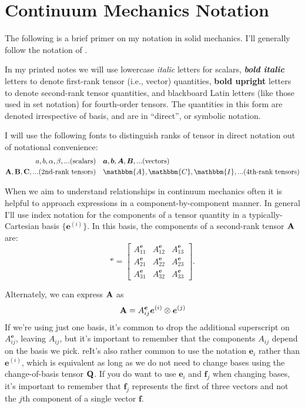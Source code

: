 \section*{Continuum Mechanics Notation} 

The following is a brief primer on my notation in solid mechanics. 
I'll generally follow the notation of \citet{holzapfelNonlinearSolidMechanics2002}. 
 
In my printed notes we will use lowercase \textit{italic} letters for scalars, \textit{\textbf{bold italic}} letters to denote first-rank tensor (i.e., vector) quantities, \textbf{bold upright} letters to denote second-rank tensor quantities, and blackboard Latin letters (like those used in set notation) for fourth-order tensors. 
The quantities in this form are denoted irrespective of basis, and are in ``direct'', or symbolic notation. 

\noindent I will use the following fonts to distinguish ranks of tensor in direct notation out of notational convenience:
\begin{eqnarray*}
a, b, \alpha, \beta, ... (\textrm{scalars}) & ~~~ \bm{a}, \bm{b}, \bm{A}, \bm{B}, ... (\textrm{vectors})\\
\mathbf{A}, \mathbf{B}, \mathbf{C}, ...(\textrm{2nd-rank tensors}) & ~~~ \mathbbm{A}, \mathbbm{C}, \mathbbm{I},... (\textrm{4th-rank tensors})
\end{eqnarray*}
    
When we aim to understand relationships in continuum mechanics often it is helpful to approach expressions in a component-by-component manner. 
In general I'll use index notation for the components of a tensor quantity in a typically-Cartesian basis $\{\bm{e}^{(i)}\}$. 
In this basis, the components of a second-rank tensor $\mathbf{A}$ are:
\begin{equation*}
    [\bn{A}]^{\bm{e}} = \begin{bmatrix}
A_{11}^{\bm{e}}  & A_{12}^{\bm{e}}  & A_{13}^{\bm{e}} \\
A_{21}^{\bm{e}}  & A_{22}^{\bm{e}}  & A_{23}^{\bm{e}} \\
A_{31}^{\bm{e}}  & A_{32}^{\bm{e}}  & A_{33}^{\bm{e}} 
\end{bmatrix}.
\end{equation*}

Alternately, we can express $\mathbf{A}$ as
\begin{equation*}
    \mathbf{A} = A_{ij}^{\bm{e}} \bm{e}^{(i)} \otimes \bm{e}^{(j)}
\end{equation*}
If we're using just one basis, it's common to drop the additional superscript on $A_{ij}^{\bm{e}}$, leaving $A_{ij}$, but it's important to remember that the components $A_{ij}$ depend on the basis we pick.
reIt's also rather common to use the notation $\bm{e}_i$ rather than $\bm{e}^{(i)}$, which is equivalent as long as we do not need to change bases using the change-of-basis tensor $\mathbf{Q}$. 
If you do want to use $\bm{e}_i$ and $\bm{f}_j$ when changing bases, it's important to remember that $\bm{f}_j$ represents the first of three vectors and not the $j$th component of a single vector $\bm{f}$. 


